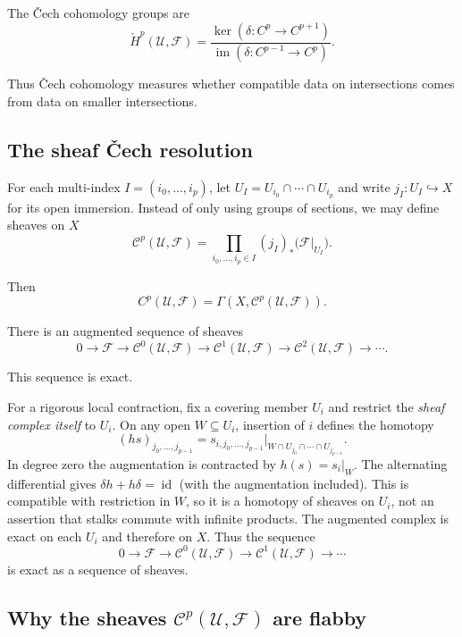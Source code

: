 The \v{C}ech cohomology groups are
\[
\check H^p(\mathcal U,\mathcal F)
=
\frac{\ker(\delta:C^p\to C^{p+1})}
{\operatorname{im}(\delta:C^{p-1}\to C^p)}.
\]

Thus \v{C}ech cohomology measures whether compatible data on intersections
comes from data on smaller intersections.

\subsection*{The sheaf \v{C}ech resolution}

For each multi-index $I=(i_0,\ldots,i_p)$, let
$U_I=U_{i_0}\cap\cdots\cap U_{i_p}$ and write
$j_I:U_I\hookrightarrow X$ for its open immersion.
Instead of only using groups of sections, we may define sheaves on $X$
\[
\mathcal C^p(\mathcal U,\mathcal F)
=
\prod_{i_0,\ldots,i_p\in I}
(j_I)_*\bigl(\mathcal F|_{U_I}\bigr).
\]

Then
\[
C^p(\mathcal U,\mathcal F)
=
\Gamma(X,\mathcal C^p(\mathcal U,\mathcal F)).
\]

There is an augmented sequence of sheaves
\[
0\longrightarrow \mathcal F
\longrightarrow \mathcal C^0(\mathcal U,\mathcal F)
\longrightarrow \mathcal C^1(\mathcal U,\mathcal F)
\longrightarrow \mathcal C^2(\mathcal U,\mathcal F)
\longrightarrow \cdots.
\]

This sequence is exact.

For a rigorous local contraction, fix a covering member $U_i$ and
restrict the \emph{sheaf complex itself} to $U_i$. On any open
$W\subseteq U_i$, insertion of $i$ defines the homotopy
\[
(hs)_{j_0,\ldots,j_{p-1}}=
 s_{i,j_0,\ldots,j_{p-1}}
 \big|_{W\cap U_{j_0}\cap\cdots\cap U_{j_{p-1}}}.
\]
In degree zero the augmentation is contracted by $h(s)=s_i|_W$.
The alternating differential gives
$\delta h+h\delta=\operatorname{id}$ (with the augmentation
included). This is compatible with restriction in $W$, so it is a
homotopy of sheaves on $U_i$, not an assertion that stalks commute
with infinite products. The augmented complex is exact on each $U_i$
and therefore on $X$. Thus the
sequence
\[
0\longrightarrow \mathcal F
\longrightarrow \mathcal C^0(\mathcal U,\mathcal F)
\longrightarrow \mathcal C^1(\mathcal U,\mathcal F)
\longrightarrow \cdots
\]
is exact as a sequence of sheaves.

\subsection*{Why the sheaves $\mathcal C^p(\mathcal U,\mathcal F)$ are flabby}

